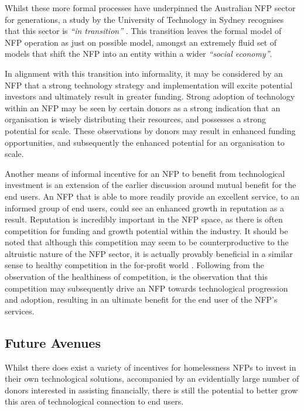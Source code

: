 Whilst these more formal processes have underpinned the Australian NFP sector for generations, a study by the University of Technology in Sydney recognises that this sector is \emph{“in transition”} \cite{logue2014emergence}. This transition leaves the formal model of NFP operation as just on possible model, amongst an extremely fluid set of models that shift the NFP into an entity within a wider \emph{“social economy”}. 

In alignment with this transition into informality, it may be considered by an NFP that a strong technology strategy and implementation will excite potential investors and ultimately result in greater funding. Strong adoption of technology within an NFP may be seen by certain donors as a strong indication that an organisation is wisely distributing their resources, and possesses a strong potential for scale. These observations by donors may result in enhanced funding opportunities, and subsequently the enhanced potential for an organisation to scale.

Another means of informal incentive for an NFP to benefit from technological investment is an extension of the earlier discussion around mutual benefit for the end users. An NFP that is able to more readily provide an excellent service, to an informed group of end users, could see an enhanced growth in reputation as a result. Reputation is incredibly important in the NFP space, as there is often competition for funding and growth potential within the industry. It should be noted that although this competition may seem to be counterproductive to the altruistic nature of the NFP sector, it is actually provably beneficial in a similar sense to healthy competition in the for-profit world \cite{philipson2009antitrust}. Following from the observation of the healthiness of competition, is the observation that this competition may subsequently drive an NFP towards technological progression and adoption, resulting in an ultimate benefit for the end user of the NFP's services.

\subsection{Future Avenues}

Whilst there does exist a variety of incentives for homelessness NFPs to invest in their own technological solutions, accompanied by an evidentially large number of donors interested in assisting financially, there is still the potential to better grow this area of technological connection to end users.

